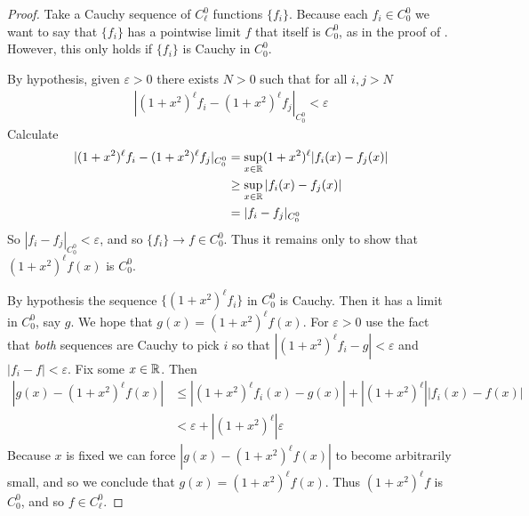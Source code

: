       \begin{proof}
        Take a Cauchy sequence of $C^0_\ell$ functions $\{f_i\}$.
        Because each $f_i\in C^0_0$ we want to say that $\{f_i\}$ has a pointwise limit $f$ that itself is $C^0_0$, as in the proof of .
        However, this only holds if $\{f_i\}$ is Cauchy in $C^0_0$. 

        By hypothesis, given $\varepsilon>0$ there exists $N>0$ such that for all $i,j>N$
        \begin{align*}
          |(1+x^2)^\ell f_i - (1+x^2)^\ell f_j|_{C^0_0} < \varepsilon
        \end{align*}
        Calculate 
        \begin{align*}
          |(1+x^2)^\ell f_i - (1+x^2)^\ell f_j|_{C^0_0}
          &= \sup_{x\in\mathbb{R}}(1+x^2)^\ell|f_i(x)-f_j(x)|\\
          &\ge \sup_{x\in\mathbb{R}}|f_i(x)-f_j(x)|\\
          &= |f_i-f_j|_{C^0_0}
        \end{align*}
        So $|f_i-f_j|_{C^0_0}<\varepsilon$, and so $\{f_i\}\rightarrow f\in C^0_0$.
        Thus it remains only to show that $(1+x^2)^\ell f(x)$ is $C^0_0$.
        
        By hypothesis the sequence $\{(1+x^2)^\ell f_i\}$ in $C^0_0$ is Cauchy.
        Then it has a limit in $C^0_0$, say $g$.
        We hope that $g(x)=(1+x^2)^\ell f(x)$.
        For $\varepsilon>0$ use the fact that \emph{both} sequences are Cauchy to pick $i$ so that $|(1+x^2)^\ell f_i - g|<\varepsilon$ and $|f_i - f|<\varepsilon$.
        Fix some $x\in\mathbb{R}$.
        Then
        \begin{align*}
          |g(x) - (1+x^2)^\ell f(x)| &\le |(1+x^2)^\ell f_i(x) - g(x)|+|(1+x^2)^\ell||f_i(x)-f(x)|\\
          &< \varepsilon + |(1+x^2)^\ell|\varepsilon
        \end{align*}
        Because $x$ is fixed we can force $|g(x)-(1+x^2)^\ell f(x)|$ to become arbitrarily small, and so we conclude that $g(x)=(1+x^2)^\ell f(x)$.
        Thus $(1+x^2)^\ell f$ is $C^0_0$, and so $f\in C^0_\ell$.
      \end{proof}


